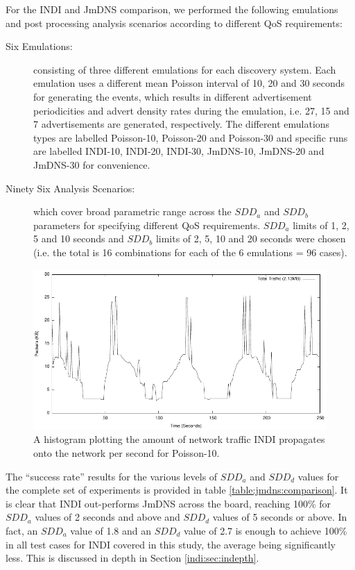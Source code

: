 
For the INDI and JmDNS comparison, we performed the following emulations and post processing analysis scenarios according to different QoS requirements:

\begin{description}
\item [Six Emulations:] consisting of three different emulations for each discovery system. Each emulation uses a different mean Poisson interval of 10, 20 and 30 seconds for generating the  events, which results in different advertisement periodicities and advert density rates during the emulation, i.e. 27, 15 and 7 advertisements are generated, respectively. The different emulations types are labelled Poisson-10, Poisson-20 and Poisson-30 and specific runs are labelled INDI-10, INDI-20, INDI-30, JmDNS-10, JmDNS-20 and JmDNS-30 for convenience.
\item [Ninety Six Analysis Scenarios:] which cover broad parametric range across the $SDD_{a}$ and $SDD_{b}$ parameters for specifying different QoS requirements. $SDD_{a}$ limits of 1, 2, 5 and 10 seconds and $SDD_{b}$ limits of 2, 5, 10 and 20 seconds were chosen (i.e. the total is 16 combinations for each of the 6 emulations = 96 cases).
\end{description}



\begin{figure}
\centering
\includegraphics[scale=1.0]{indi10packet-distribution.pdf}
\caption{A histogram plotting the amount of network traffic INDI propagates onto the network per second for Poisson-10.} 
\label{indi:fig:indi-10-traffic}
\end{figure}

The ``success rate'' results for the various levels of $SDD_{a}$ and $SDD_{d}$ values for the complete set of experiments is provided in table \ref{table:jmdns:comparison}.  It is clear that INDI out-performs JmDNS across the board, reaching 100\% for $SDD_{a}$ values of 2 seconds and above and $SDD_{d}$ values of 5 seconds or above.   In fact, an $SDD_{a}$ value of 1.8 and  an $SDD_{d}$ value of 2.7 is enough to achieve 100\% in all test cases for INDI covered in this study, the average being significantly less. This is discussed in depth in Section \ref{indi:sec:indepth}.  
 
